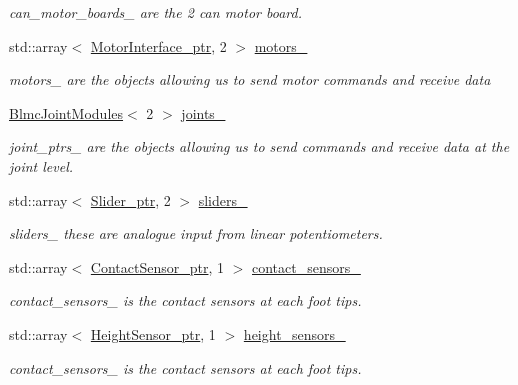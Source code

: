 \begin{DoxyCompactItemize}
\begin{DoxyCompactList}\small\item\em can\+\_\+motor\+\_\+boards\+\_\+ are the 2 can motor board. \end{DoxyCompactList}\item 
\mbox{\label{classblmc__robots_1_1Teststand_ae530206f8c54cbc04d7cf69a16d1e99a}} 
std\+::array$<$ \hyperlink{common__header_8hpp_ae1a0f9992bc8fbbc1943d887f517c180}{Motor\+Interface\+\_\+ptr}, 2 $>$ \hyperlink{classblmc__robots_1_1Teststand_ae530206f8c54cbc04d7cf69a16d1e99a}{motors\+\_\+}
\begin{DoxyCompactList}\small\item\em motors\+\_\+ are the objects allowing us to send motor commands and receive data \end{DoxyCompactList}\item 
\hyperlink{classblmc__robots_1_1BlmcJointModules}{Blmc\+Joint\+Modules}$<$ 2 $>$ \hyperlink{classblmc__robots_1_1Teststand_a2c14882d88deb56edde5240a8d841f2a}{joints\+\_\+}
\begin{DoxyCompactList}\small\item\em joint\+\_\+ptrs\+\_\+ are the objects allowing us to send commands and receive data at the joint level. \end{DoxyCompactList}\item 
\mbox{\label{classblmc__robots_1_1Teststand_a2a67df9dc9004f9e70bcdd6ad8f8189e}} 
std\+::array$<$ \hyperlink{common__header_8hpp_a4cb9a95e8b2c0bf237ce29f5252c7b73}{Slider\+\_\+ptr}, 2 $>$ \hyperlink{classblmc__robots_1_1Teststand_a2a67df9dc9004f9e70bcdd6ad8f8189e}{sliders\+\_\+}
\begin{DoxyCompactList}\small\item\em sliders\+\_\+ these are analogue input from linear potentiometers. \end{DoxyCompactList}\item 
std\+::array$<$ \hyperlink{common__header_8hpp_ac78fe5c68e56a3b884117109959e4d58}{Contact\+Sensor\+\_\+ptr}, 1 $>$ \hyperlink{classblmc__robots_1_1Teststand_af2f14b46da7f2dfbeeea59b47669f1e8}{contact\+\_\+sensors\+\_\+}
\begin{DoxyCompactList}\small\item\em contact\+\_\+sensors\+\_\+ is the contact sensors at each foot tips. \end{DoxyCompactList}\item 
std\+::array$<$ \hyperlink{common__header_8hpp_a921d3f5a8878524375bf7e740f2fb788}{Height\+Sensor\+\_\+ptr}, 1 $>$ \hyperlink{classblmc__robots_1_1Teststand_a41a93d1d128333a9981603eb82d068c0}{height\+\_\+sensors\+\_\+}
\begin{DoxyCompactList}\small\item\em contact\+\_\+sensors\+\_\+ is the contact sensors at each foot tips. \end{DoxyCompactList}\end{DoxyCompactItemize}
